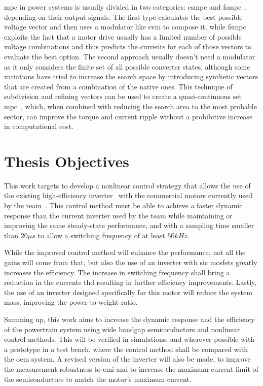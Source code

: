  \gls{mpc} in power systems is usually divided in two categories: \gls{csmpc} and \gls{fsmpc}~\cite{Wang:MPC_in_Electrical_Machines_review:2017:IEEE}, depending on their output signals. The first type calculates the best possible voltage vector and then uses a modulator like \gls{svm} to compose it, while \gls{fsmpc} exploits the fact that a motor drive usually has a limited number of possible voltage combinations and thus predicts the currents for each of those vectors to evaluate the best option. The second approach usually doesn't need a modulator as it only considers the finite set of all possible converter states, although some variations have tried to increase the search space by introducing synthetic vectors that are created from a combination of the native ones. This technique of subdivision and refining vectors can be used to create a quasi-continuous set \gls{mpc}~\cite{Ma:MPC_Syntetic_vector:2014:IEEE}, which, when combined with reducing the search area to the most probable sector, can improve the torque and current ripple without a prohibitive increase in computational cost.
\section{Thesis Objectives}\label{section:objectives}

This work targets to develop a nonlinear control strategy that allows the use of the existing high-efficiency inverter~\cite{Costa:MSc} with the commercial motors currently used by the team~\cite{amk:DD5-14-10-POW}. This control method must be able to achieve a faster dynamic response than the current inverter used by the team while maintaining or improving the same steady-state performance, and with a sampling time smaller than $20\mu s$ to allow a switching frequency of at least $50kHz$.

While the improved control method will enhance the performance, not all the gains will come from that, but also the use of an inverter with \gls{sic} \glspl{mosfet} greatly increases the efficiency. The increase in switching frequency shall bring a reduction in the currents \gls{thd} resulting in further efficiency improvements. Lastly, the use of an inverter designed specifically for this motor will reduce the system mass, improving the power-to-weight ratio.

Summing up, this work aims to increase the dynamic response and the efficiency of the powertrain system using wide bandgap semiconductors and nonlinear control methods. This will be verified in simulations, and wherever possible with a prototype in a test bench, where the control method shall be compared with the \gls{oem} system. A revised version of the inverter will also be made, to improve the measurement robustness to \gls{emi} and to increase the maximum current limit of the semiconductors to match the motor's maximum current.


